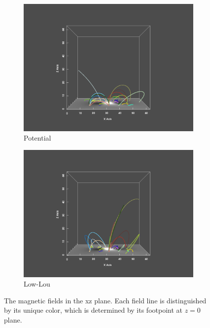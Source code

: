 \begin{figure}
  \begin{subfigure}{.5\linewidth}
    \centering
    \caption{Potential}
    \includegraphics[trim={6cm 1cm 6cm 2cm}, clip, width=\linewidth]{"img/LL_pot_xz.pdf"}
  \end{subfigure}%
  \begin{subfigure}{.5\linewidth}
    \centering
    \caption{Low-Lou}
    \includegraphics[trim={6cm 1cm 6cm 2cm}, clip, width=\linewidth]{"img/LL_xz.pdf"}
  \end{subfigure}
  
  \caption{The magnetic fields in the xz plane. Each field line is distinguished by its unique color, which is determined by its footpoint at $z=0$ plane.}\label{fig:xz}
\end{figure}


